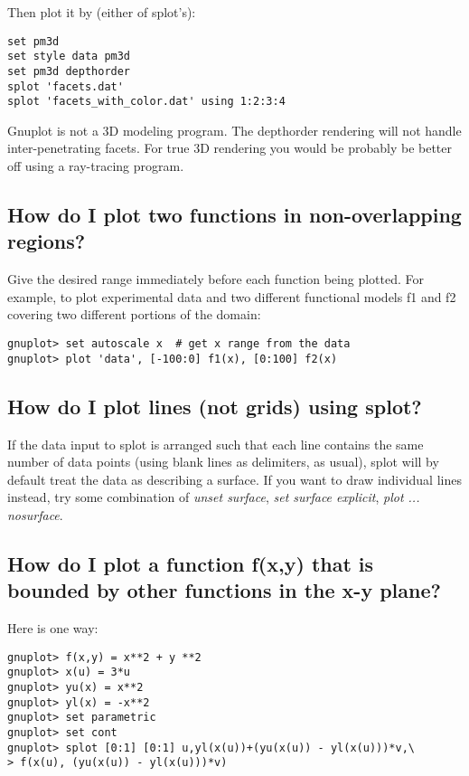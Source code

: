 \documentclass[a4paper,11pt]{article}
\begin{document}
Then plot it by (either of splot's):
\small
\begin{verbatim}
set pm3d
set style data pm3d
set pm3d depthorder
splot 'facets.dat'
splot 'facets_with_color.dat' using 1:2:3:4
\end{verbatim}
\normalsize

Gnuplot is not a 3D modeling program.
The depthorder rendering will not handle inter-penetrating facets.
For true 3D rendering you would be probably be better off using a ray-tracing program.

\subsection{How do I plot two functions in non-overlapping regions?}

Give the desired range immediately before each function being plotted.
For example, to plot experimental data and two different functional
models f1 and f2 covering two different portions of the domain:
\small
\begin{verbatim}
gnuplot> set autoscale x  # get x range from the data
gnuplot> plot 'data', [-100:0] f1(x), [0:100] f2(x)
\end{verbatim}
\normalsize


\subsection{How do I plot lines (not grids) using splot?}

If the data input to splot is arranged such that each line contains
the same number of data points (using blank lines as delimiters, as usual),
splot will by default treat the data as describing a surface.
If you want to draw individual lines instead, try some combination of
\textit{unset surface}, \textit{set surface explicit}, \textit{plot ... nosurface}.


\subsection{How do I plot a function f(x,y) that is bounded by other
          functions in the x-y plane?}

Here is one way:
\small
\begin{verbatim}
gnuplot> f(x,y) = x**2 + y **2
gnuplot> x(u) = 3*u
gnuplot> yu(x) = x**2
gnuplot> yl(x) = -x**2
gnuplot> set parametric
gnuplot> set cont
gnuplot> splot [0:1] [0:1] u,yl(x(u))+(yu(x(u)) - yl(x(u)))*v,\
> f(x(u), (yu(x(u)) - yl(x(u)))*v)
\end{verbatim}
\normalsize
\end{document}
